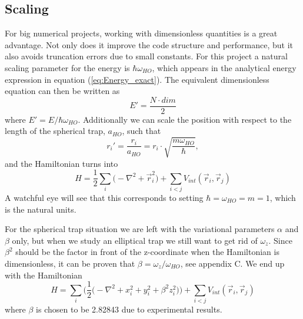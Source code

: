 \documentclass[norsk,a4paper,12pt]{article}
\begin{document}
\subsection{Scaling} \label{sec:scaling}
For big numerical projects, working with dimensionless quantities is a great advantage. Not only does it improve the code structure and performance, but it also avoids truncation errors due to small constants. For this project a natural scaling parameter for the energy is $\hbar\omega_{HO}$, which appears in the analytical energy expression in equation (\ref{eq:Energy_exact}). The equivalent dimensionless equation can then be written as
\begin{equation}
E'=\frac{N\cdot dim}{2}
\end{equation}
where $E'=E/\hbar\omega_{HO}$. Additionally we can scale the position with respect to the length of the spherical trap, $a_{HO}$, such that 
\begin{equation}
r_i'=\frac{r_i}{a_{HO}}=r_i\cdot\sqrt{\frac{m\omega_{HO}}{\hbar}},
\end{equation}
and the Hamiltonian turns into
\begin{equation}
H=\frac{1}{2}\sum_i\Big(-\nabla^2 + \vec{r}_i^2\Big)+\sum_{i<j}V_{int}(\vec{r}_i,\vec{r}_j)
\end{equation}
A watchful eye will see that this corresponds to setting $\hbar=\omega_{HO}=m=1$, which is the natural units. 

For the spherical trap situation we are left with the variational parameters $\alpha$ and $\beta$ only, but when we study an elliptical trap we still want to get rid of $\omega_z$. Since $\beta^2$ should be the factor in front of the z-coordinate when the Hamiltonian is dimensionless, it can be proven that $\beta=\omega_z/\omega_{HO}$, see appendix C. We end up with the Hamiltonian
\begin{equation}
H=\sum_i\bigg(\frac{1}{2}\Big(-\nabla^2 + x_i^2 + y_i^2 + \beta^2z_i^2\Big)\bigg)+\sum_{i<j}V_{int}(\vec{r}_i,\vec{r}_j)
\end{equation} 
where $\beta$ is chosen to be 2.82843 due to experimental results.
\end{document}
